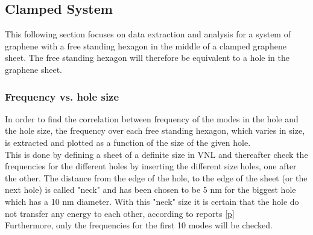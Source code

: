 \subsection{Clamped System}
This following section focuses on data extraction and analysis for a system of graphene with a free standing hexagon in the middle of a clamped graphene sheet. The free standing hexagon will therefore be equivalent to a hole in the graphene sheet.  
\subsubsection{Frequency vs. hole size}
In order to find the correlation between frequency of the modes in the hole and the hole size, the frequency over each free standing hexagon, which varies in size, is extracted and plotted as a function of the size of the given hole. \\
This is done by defining a sheet of a definite size in VNL and thereafter check the frequencies for the different holes by inserting the different size holes, one after the other. The distance from the edge of the hole, to the edge of the sheet (or the next hole) is called "neck" and has been chosen to be 5 nm for the biggest hole which has a 10 nm diameter. With this "neck" size it is certain that the hole do not transfer any energy to each other, according to reports \ref{p} \\
Furthermore, only the frequencies for the first 10 modes will be checked.
\onecolumngrid

